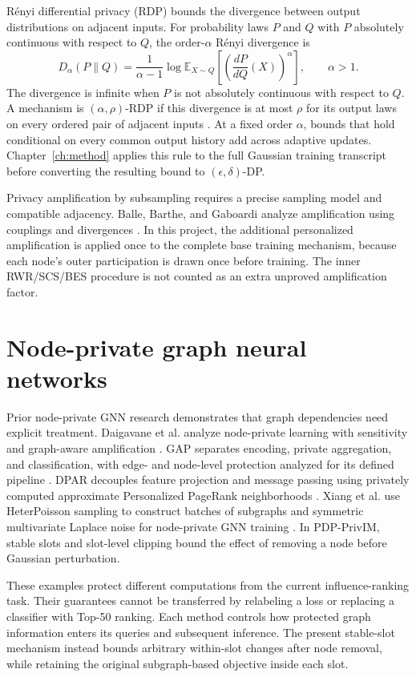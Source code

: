 R\'enyi differential privacy (RDP) bounds the divergence between output distributions on adjacent inputs. For probability laws $P$ and $Q$ with $P$ absolutely continuous with respect to $Q$, the order-$\alpha$ R\'enyi divergence is
\begin{equation}
 D_\alpha(P\|Q)=\frac{1}{\alpha-1}
 \log \mathbb{E}_{X\sim Q}\!\left[\left(\frac{dP}{dQ}(X)\right)^\alpha\right],
 \qquad \alpha>1.
\end{equation}
The divergence is infinite when $P$ is not absolutely continuous with respect to $Q$. A mechanism is $(\alpha,\rho)$-RDP if this divergence is at most $\rho$ for its output laws on every ordered pair of adjacent inputs \cite{mironov2017}. At a fixed order $\alpha$, bounds that hold conditional on every common output history add across adaptive updates. Chapter~\ref{ch:method} applies this rule to the full Gaussian training transcript before converting the resulting bound to $(\epsilon,\delta)$-DP.

Privacy amplification by subsampling requires a precise sampling model and compatible adjacency. Balle, Barthe, and Gaboardi analyze amplification using couplings and divergences \cite{balle2018}. In this project, the additional personalized amplification is applied once to the complete base training mechanism, because each node's outer participation is drawn once before training. The inner RWR/SCS/BES procedure is not counted as an extra unproved amplification factor.

\section{Node-private graph neural networks}
Prior node-private GNN research demonstrates that graph dependencies need explicit treatment. Daigavane et al. analyze node-private learning with sensitivity and graph-aware amplification \cite{daigavane2021}. GAP separates encoding, private aggregation, and classification, with edge- and node-level protection analyzed for its defined pipeline \cite{sajadmanesh2023}. DPAR decouples feature projection and message passing using privately computed approximate Personalized PageRank neighborhoods \cite{zhang2024}. Xiang et al. use HeterPoisson sampling to construct batches of subgraphs and symmetric multivariate Laplace noise for node-private GNN training \cite{xiang2024}. In PDP-PrivIM, stable slots and slot-level clipping bound the effect of removing a node before Gaussian perturbation.

These examples protect different computations from the current influence-ranking task. Their guarantees cannot be transferred by relabeling a loss or replacing a classifier with Top-50 ranking. Each method controls how protected graph information enters its queries and subsequent inference. The present stable-slot mechanism instead bounds arbitrary within-slot changes after node removal, while retaining the original subgraph-based objective inside each slot.

